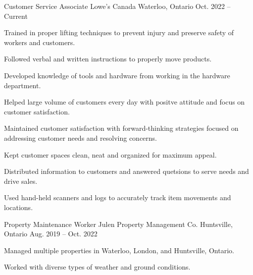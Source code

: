 

\begin{cventries}

  \cventry
    {Customer Service Associate} %
    {Lowe's Canada} %
    {Waterloo, Ontario} %
    {Oct. 2022 -- Current} %
    {
      \begin{cvitems} %
        \item {Trained in proper lifting techniques to prevent injury and preserve safety of workers and customers.}
        \item {Followed verbal and written instructions to properly move products.}
        \item {Developed knowledge of tools and hardware from working in the hardware department.}
        \item {Helped large volume of customers every day with positve attitude and focus on customer satisfaction.}
        \item {Maintained customer satisfaction with forward-thinking strategies focused on addressing customer needs and resolving concerns.}
        \item {Kept customer spaces clean, neat and organized for maximum appeal.}
        \item {Distributed information to customers and answered quetsions to serve needs and drive sales.}
        \item {Used hand-held scanners and logs to accurately track item movements and locations.}
      \end{cvitems}
    }
  \cventry
    {Property Maintenance Worker} %
    {Julen Property Management Co.} %
    {Huntsville, Ontario} %
    {Aug. 2019 -- Oct. 2022} %
    {
      \begin{cvitems} %
        \item {Managed multiple properties in Waterloo, London, and Huntsville, Ontario.}
        \item {Worked with diverse types of weather and ground conditions.}

\end{cvitems}}
\end{cventries}
